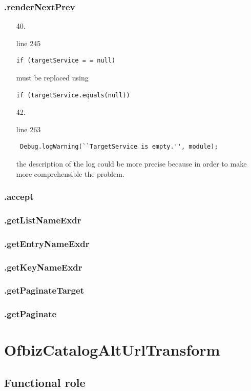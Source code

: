 \documentclass[english]{article}
\begin{document}
\subsubsection*{.renderNextPrev}
	\begin{itemize}
	
	\item[40.]{ line 245 
		\begin{lstlisting}
if (targetService = = null) 
		\end{lstlisting} must be replaced using
		\begin{lstlisting}
if (targetService.equals(null))
		\end{lstlisting}}
	
	
	 \item[42.]{line 263
		\begin{lstlisting} 
 Debug.logWarning(``TargetService is empty.'', module);
		\end{lstlisting}
		the description of the log could be more precise because in order to make more comprehensible the problem.}
\end{itemize}
\subsubsection*{.accept}
\subsubsection*{.getListNameExdr}
\subsubsection*{.getEntryNameExdr}
\subsubsection*{.getKeyNameExdr}
\subsubsection*{.getPaginateTarget}
\subsubsection*{.getPaginate}


\section{OfbizCatalogAltUrlTransform}
	\subsection{Functional role}
\end{document}
